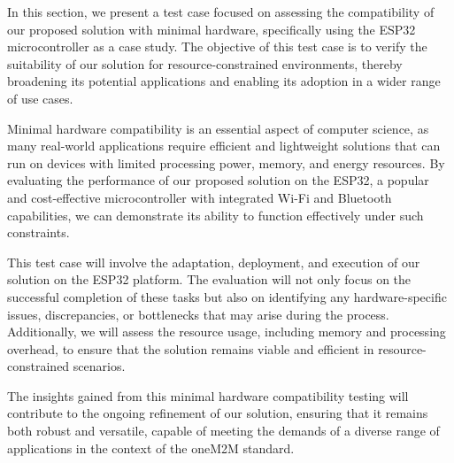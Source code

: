\documentclass[a4paper,fleqn]{cas-dc}
\begin{document}
In this section, we present a test case focused on assessing the compatibility of our proposed solution with minimal hardware, specifically using the ESP32 microcontroller as a case study. The objective of this test case is to verify the suitability of our solution for resource-constrained environments, thereby broadening its potential applications and enabling its adoption in a wider range of use cases.

Minimal hardware compatibility is an essential aspect of computer science, as many real-world applications require efficient and lightweight solutions that can run on devices with limited processing power, memory, and energy resources. By evaluating the performance of our proposed solution on the ESP32, a popular and cost-effective microcontroller with integrated Wi-Fi and Bluetooth capabilities, we can demonstrate its ability to function effectively under such constraints.

This test case will involve the adaptation, deployment, and execution of our solution on the ESP32 platform. The evaluation will not only focus on the successful completion of these tasks but also on identifying any hardware-specific issues, discrepancies, or bottlenecks that may arise during the process. Additionally, we will assess the resource usage, including memory and processing overhead, to ensure that the solution remains viable and efficient in resource-constrained scenarios.

The insights gained from this minimal hardware compatibility testing will contribute to the ongoing refinement of our solution, ensuring that it remains both robust and versatile, capable of meeting the demands of a diverse range of applications in the context of the oneM2M standard.






%
%
%
%
%
%
\end{document}
